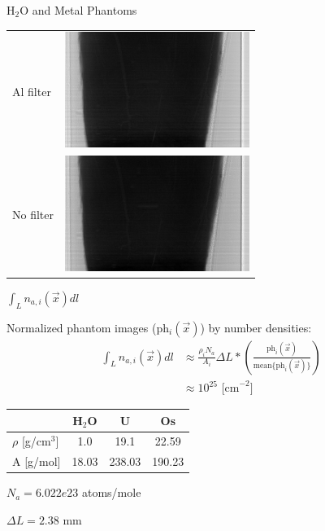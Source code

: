 \documentclass[presentation]{beamer}
\begin{document}
\begin{frame}{H$_2$O and Metal Phantoms}
  \begin{center}
    \begin{tabular}{m{5em} m{8cm}}
      Al filter & \includegraphics[width=6cm]{figs/Al_1080}\\
      No filter & \includegraphics[width=6cm]{figs/No_1080}
    \end{tabular}
  \end{center}
\end{frame}


\begin{frame}{$\int_L n_{a,i}(\vec{x}) dl$}

  Normalized phantom images (ph$_i(\vec{x})$) by number densities:
  \begin{align}
    \int_L n_{a,i}(\vec{x}) dl &\approx \frac{\rho_i N_a}{A_i} \Delta L * \left(\frac{\text{ph}_i(\vec{x})}{\text{mean}\{\text{ph}_i(\vec{x})\}}\right)\\
                               &\approx 10^{25} \text{ [cm}^{-2}]
  \end{align}

  \begin{table}
    \centering
    \begin{tabular}{l |c c c}
      & H$_2$O & U & Os\\\hline
      $\rho$ [g/cm$^{3}$] & 1.0 & 19.1 & 22.59\\
      A [g/mol] & 18.03 & 238.03 & 190.23\\
    \end{tabular}      
  \end{table}

  \centering
  $N_a = 6.022e23$ atoms/mole

  $\Delta L = 2.38$ mm

  

\end{frame}
\end{document}
